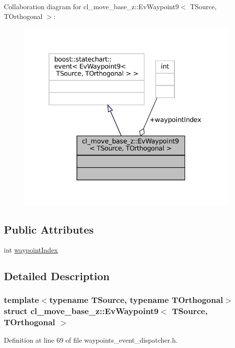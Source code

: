 Collaboration diagram for cl\+\_\+move\+\_\+base\+\_\+z\+:\+:Ev\+Waypoint9$<$ T\+Source, T\+Orthogonal $>$\+:
\nopagebreak
\begin{figure}[H]
\begin{center}
\leavevmode
\includegraphics[width=317pt]{structcl__move__base__z_1_1EvWaypoint9__coll__graph}
\end{center}
\end{figure}
\subsection*{Public Attributes}
\begin{DoxyCompactItemize}
\item 
int \hyperlink{structcl__move__base__z_1_1EvWaypoint9_a51581dc5883298a3e25eec51d8fca78b}{waypoint\+Index}
\end{DoxyCompactItemize}


\subsection{Detailed Description}
\subsubsection*{template$<$typename T\+Source, typename T\+Orthogonal$>$\newline
struct cl\+\_\+move\+\_\+base\+\_\+z\+::\+Ev\+Waypoint9$<$ T\+Source, T\+Orthogonal $>$}



Definition at line 69 of file waypoints\+\_\+event\+\_\+dispatcher.\+h.



